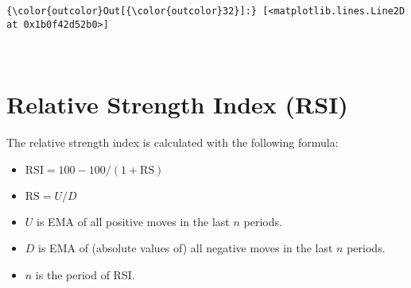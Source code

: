 \documentclass[11pt]{article}
\providecommand{\tightlist}{%
      \setlength{\itemsep}{0pt}\setlength{\parskip}{0pt}}
\begin{document}
\begin{Verbatim}[commandchars=\\\{\}]
{\color{outcolor}Out[{\color{outcolor}32}]:} [<matplotlib.lines.Line2D at 0x1b0f42d52b0>]
\end{Verbatim}
            
    \begin{center}
    \end{center}
    { \hspace*{\fill} \\}
    
    \hypertarget{relative-strength-index-rsi}{%
\section{Relative Strength Index
(RSI)}\label{relative-strength-index-rsi}}

    The relative strength index is calculated with the following formula:

\begin{itemize}
\tightlist
\item
  \(\text{RSI}=100-100/(1+\text{RS})\)
\item
  \(\text{RS}=U / D\)
\item
  \(U\) is EMA of all positive moves in the last \(n\) periods.
\item
  \(D\) is EMA of (absolute values of) all negative moves in the last
  \(n\) periods.
\item
  \(n\) is the period of RSI.
\end{itemize}
\end{document}

